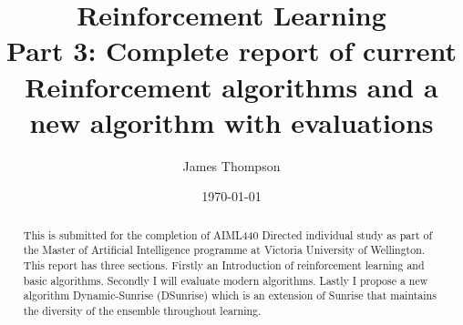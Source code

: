 \documentclass[11pt
              , a4paper
              , twoside
              , openright
              ]{report}
\title{Reinforcement Learning \\
\large Part 3: Complete report of current Reinforcement algorithms and a new algorithm with evaluations}
\author{James Thompson}
\date{\today}
\begin{document}
\frontmatter



\begin{abstract}
This is submitted for the completion of AIML440 Directed individual study as part of the Master of Artificial Intelligence programme at Victoria University of Wellington. This report has three sections. Firstly an Introduction of reinforcement learning and basic algorithms. Secondly I will evaluate modern algorithms. Lastly I propose a new algorithm Dynamic-Sunrise (DSunrise) which is an extension of Sunrise that maintains the diversity of the ensemble throughout learning.
\end{abstract}


\maketitle

% 

\tableofcontents



\mainmatter
















\backmatter



%



\appendix


\end{document}
